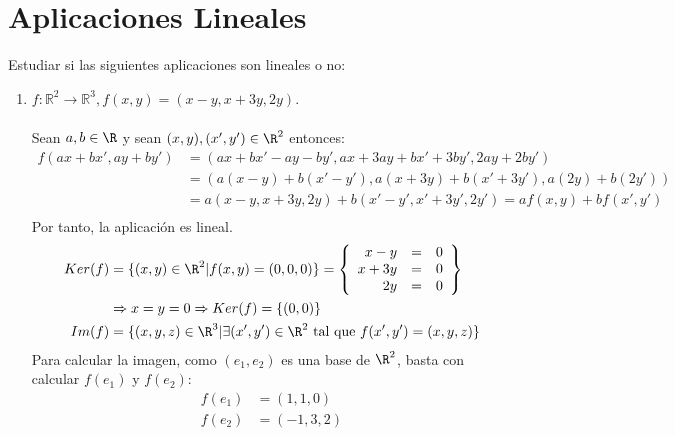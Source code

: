 \section{Aplicaciones Lineales}
\begin{ejercicio}Estudiar si las siguientes aplicaciones son lineales o no:
	\begin{enumerate}
		\item \( f: \mathbb{R}^2 \rightarrow \mathbb{R}^3, f(x,y) = (x - y, x + 3y, 2y) \).
		      \\ \\
		      Sean $a,b \in \R$ y sean $(x,y),(x',y') \in \R^2$ entonces:
		      \begin{align*}
			      f(ax+bx',ay+by') & = (ax+bx'-ay-by',ax+3ay+bx'+3by',2ay+2by')               \\
			                       & = (a(x-y)+b(x'-y'),a(x+3y)+b(x'+3y'),a(2y)+b(2y'))       \\
			                       & = a(x-y,x+3y,2y)+b(x'-y',x'+3y',2y') = af(x,y)+bf(x',y') \\
		      \end{align*}
		      Por tanto, la aplicación es lineal.
		      \begin{align*}
			      Ker(f) & = \{(x,y) \in \R^2 | f(x,y) = (0,0,0)\} = \left\{
			      \begin {array}{rcl}
			      x-y    & =                                                                                     & 0 \\
			      x+3y   & =                                                                                     & 0 \\
			      2y     & =                                                                                     & 0
			      \end {array}
			      \right\}                                                                                           \\ &\Rightarrow x=y=0 \Rightarrow Ker(f) = \{(0,0)\}                                          \\
			      Im(f)  & = \{(x,y,z) \in \R^3 | \exists (x',y') \in \R^2 \text{ tal que } f(x',y') = (x,y,z)\}
		      \end{align*}
		      Para calcular la imagen, como $(e_1,e_2)$ es una base de $\R^2$, basta con calcular $f(e_1)$ y $f(e_2)$:
		      \begin{align*}
			      f(e_1) & = (1,1,0)  \\
			      f(e_2) & = (-1,3,2)

\end{align*}
\end{enumerate}
\end{ejercicio}
